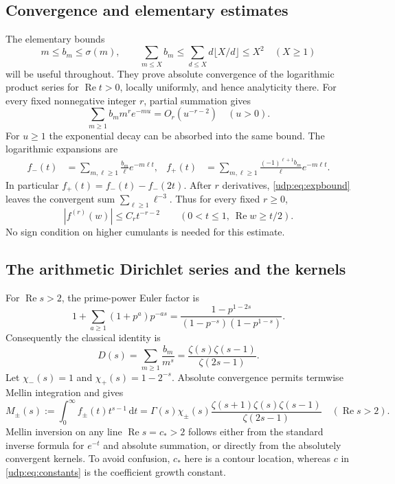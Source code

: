 \documentclass[11pt]{article}
\theoremstyle{remark}\newtheorem{remark}[theorem]{Remark}
\DeclareMathOperator{\Rea}{Re}
\newcommand{\dd}{\,\mathrm d}
\newcommand{\ch}{\chi}
\numberwithin{equation}{section}
\begin{document}
\subsection{Convergence and elementary estimates}
The elementary bounds
\begin{equation}\label{udp:eq:b-bounds}
 m\le b_m\le\sigma(m),\qquad
 \sum_{m\le X}b_m\le\sum_{d\le X}d\lfloor X/d\rfloor\le X^2
 \quad(X\ge1)
\end{equation}
will be useful throughout. They prove absolute convergence of the logarithmic product series for $\Rea t>0$, locally uniformly, and hence analyticity there. For every fixed nonnegative integer $r$, partial summation gives
\begin{equation}\label{udp:eq:expbound}
 \sum_{m\ge1}b_m m^r e^{-mu}=O_r(u^{-r-2})\quad(u>0).
\end{equation}
For $u\ge1$ the exponential decay can be absorbed into the same bound. The logarithmic expansions are
\begin{align*}
 f_-(t)&=\sum_{m,\ell\ge1}\frac{b_m}{\ell}e^{-m\ell t},&
 f_+(t)&=\sum_{m,\ell\ge1}\frac{(-1)^{\ell+1}b_m}{\ell}e^{-m\ell t}.
\end{align*}
In particular $f_+(t)=f_-(t)-f_-(2t)$. After $r$ derivatives, \eqref{udp:eq:expbound} leaves the convergent sum $\sum_{\ell\ge1}\ell^{-3}$. Thus for every fixed $r\ge0$,
\begin{equation}\label{udp:eq:complexderivative}
 |f^{(r)}(w)|\le C_r t^{-r-2}\qquad
 (0<t\le1,\ \Rea w\ge t/2).
\end{equation}
No sign condition on higher cumulants is needed for this estimate.

\subsection{The arithmetic Dirichlet series and the kernels}
For $\Rea s>2$, the prime-power Euler factor is
\[
 1+\sum_{a\ge1}(1+p^a)p^{-as}
 =\frac{1-p^{1-2s}}{(1-p^{-s})(1-p^{1-s})}.
\]
Consequently the classical identity \cite[Section 4.9, p.~28]{toth} is
\begin{equation}\label{udp:eq:D}
 D(s)=\sum_{m\ge1}\frac{b_m}{m^s}
 =\frac{\zeta(s)\zeta(s-1)}{\zeta(2s-1)}.
\end{equation}
Let $\ch_-(s)=1$ and $\ch_+(s)=1-2^{-s}$. Absolute convergence permits termwise Mellin integration and gives
\begin{equation}\label{udp:eq:M}
 M_\pm(s):=\int_0^\infty f_\pm(t)t^{s-1}\dd t
 =\Gamma(s)\ch_\pm(s)
 \frac{\zeta(s+1)\zeta(s)\zeta(s-1)}{\zeta(2s-1)}
 \quad(\Rea s>2).
\end{equation}
Mellin inversion on any line $\Rea s=c_*>2$ follows either from the standard inverse formula for $e^{-t}$ and absolute summation, or directly from the absolutely convergent kernels. To avoid confusion, $c_*$ here is a contour location, whereas $c$ in \eqref{udp:eq:constants} is the coefficient growth constant.
\end{document}
